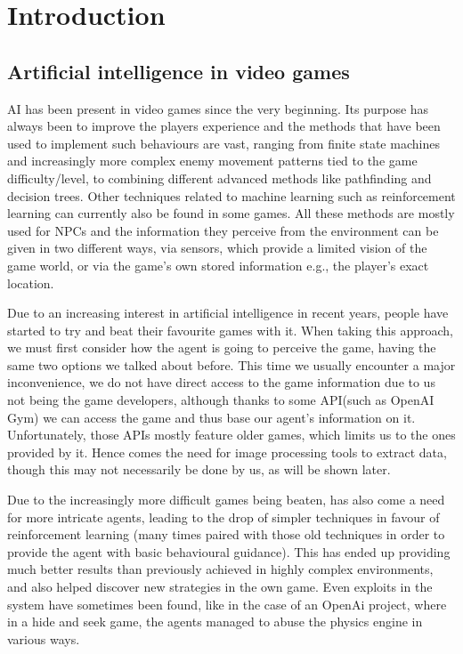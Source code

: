 
\chapter{Introduction}
\section{Artificial intelligence in video games}

AI has been present in video games since the very beginning.
Its purpose has always been to improve the players experience and the methods that have been used to implement such behaviours are vast, ranging from finite state machines and increasingly more complex enemy movement patterns tied to the game difficulty/level, to combining different advanced methods like pathfinding and decision trees. Other techniques related to machine learning such as reinforcement learning can currently also be found in some games. All these methods are mostly used for \ac{NPC}s and the information they perceive from the environment can be given in two different ways, via sensors, which provide a limited vision of the game world, or via the game’s own stored information e.g., the player’s exact location.

Due to an increasing interest in artificial intelligence in recent years, people have started to try and beat their favourite games with it. When taking this approach, we must first consider how the agent is going to perceive the game, having the same two options we talked about before. This time we usually encounter a major inconvenience, we do not have direct access to the game information due to us not being the game developers, although thanks to some \ac{API}(such as OpenAI Gym) we can access the game and thus base our agent’s information on it. Unfortunately, those APIs mostly feature older games, which limits us to the ones provided by it. Hence comes the need for image processing tools to extract data, though this may not necessarily be done by us, as will be shown later.

Due to the increasingly more difficult games being beaten, has also come a need for more intricate agents, leading to the drop of simpler techniques in favour of reinforcement learning (many times paired with those old techniques in order to provide the agent with basic behavioural guidance). This has ended up providing much better results than previously achieved in highly complex environments, and also helped discover new strategies in the own game. Even exploits in the system have sometimes been found, like in the case of an OpenAi project, where in a hide and seek game, the agents managed to abuse the physics engine in various ways. 

